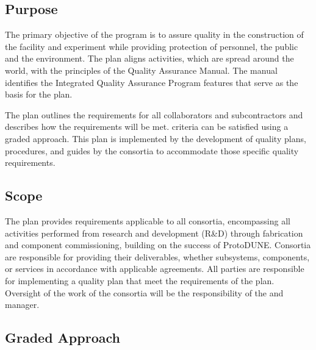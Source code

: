 \subsection{Purpose}

The primary objective of the   program is
to assure quality in the construction of the  facility and
 experiment while providing protection of
 personnel, the public and the environment. The
 plan aligns   activities, which
are spread around the world, with the principles of the \fnal Quality
Assurance Manual. The manual identifies the \fnal Integrated Quality
Assurance Program features that serve as the basis for the
  plan.

The   plan outlines the 
requirements for all  collaborators and
subcontractors and describes how the requirements will be met.
 criteria can be satisfied using a graded approach. This
 plan is implemented by the development of quality plans,
procedures, and guides by the consortia to accommodate those specific
quality requirements.

\subsection{Scope}

The   plan provides 
requirements applicable to all consortia, encompassing all activities
performed from research and development (R\&D) through fabrication and
component commissioning, building on the success of
ProtoDUNE. Consortia are responsible for providing their deliverables,
whether subsystems, components, or services in accordance with
applicable agreements. All parties are responsible for
implementing a quality plan that meet the requirements of the
  plan. Oversight of the work of
the consortia will be the responsibility of the 
 and  
manager.

\subsection{Graded Approach}

